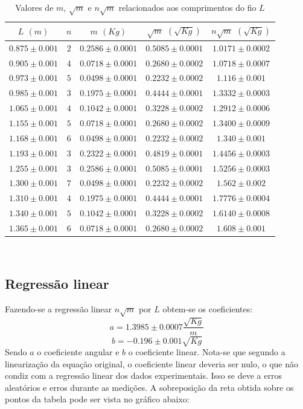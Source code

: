 \documentclass[12pt,a4paper]{article}
\begin{document}
\begin{table}[!htbp]
\centering
\def\arraystretch{1.3}
\caption{Valores de $m$, $\sqrt{m}$ e $n\sqrt{m}$ relacionados aos comprimentos do fio $L$}
\label{Resultados}
\begin{tabular}{|c|c|c|c|c|}
\hline
$L$ $(m)$ & $n$ & $m$ $(Kg)$ & $\sqrt{m}$ $(\sqrt{Kg})$ & $n\sqrt{m}$ $(\sqrt{Kg})$ \\
\hline
$0.875\pm0.001$ & $2$ & $0.2586\pm0.0001$ & $0.5085\pm0.0001$ & $1.0171\pm0.0002$ \\
\hline
$0.905\pm0.001$ & $4$ & $0.0718\pm0.0001$ & $0.2680\pm0.0002$ & $1.0718\pm0.0007$ \\
\hline
$0.973\pm0.001$ & $5$ & $0.0498\pm0.0001$ & $0.2232\pm0.0002$ & $1.116\pm0.001$ \\
\hline
$0.985\pm0.001$ & $3$ & $0.1975\pm0.0001$ & $0.4444\pm0.0001$ & $1.3332\pm0.0003$ \\
\hline
$1.065\pm0.001$ & $4$ & $0.1042\pm0.0001$ & $0.3228\pm0.0002$ & $1.2912\pm0.0006$ \\
\hline
$1.155\pm0.001$ & $5$ & $0.0718\pm0.0001$ & $0.2680\pm0.0002$ & $1.3400\pm0.0009$ \\
\hline
$1.168\pm0.001$ & $6$ & $0.0498\pm0.0001$ & $0.2232\pm0.0002$ & $1.340\pm0.001$ \\
\hline
$1.193\pm0.001$ & $3$ & $0.2322\pm0.0001$ & $0.4819\pm0.0001$ & $1.4456\pm0.0003$ \\
\hline
$1.255\pm0.001$ & $3$ & $0.2586\pm0.0001$ & $0.5085\pm0.0001$ & $1.5256\pm0.0003$ \\
\hline
$1.300\pm0.001$ & $7$ & $0.0498\pm0.0001$ & $0.2232\pm0.0002$ & $1.562\pm0.002$ \\
\hline
$1.310\pm0.001$ & $4$ & $0.1975\pm0.0001$ & $0.4444\pm0.0001$ & $1.7776\pm0.0004$ \\
\hline
$1.340\pm0.001$ & $5$ & $0.1042\pm0.0001$ & $0.3228\pm0.0002$ & $1.6140\pm0.0008$ \\
\hline
$1.365\pm0.001$ & $6$ & $0.0718\pm0.0001$ & $0.2680\pm0.0002$ & $1.608\pm0.001$ \\
\hline

\end{tabular} \\

\end{table}

\subsection{Regressão linear}
Fazendo-se a regressão linear $n\sqrt{m}$ por $L$ obtem-se os coeficientes:
$$a = 1.3985 \pm 0.0007 \dfrac{\sqrt{Kg}}{m}$$
$$b = -0.196 \pm 0.001 \sqrt{Kg}$$
Sendo $a$ o coeficiente angular e $b$ o coeficiente linear.
Nota-se que segundo a linearização da equação original, o coeficiente linear deveria ser nulo, o que não condiz com a regressão linear dos dados experimentais. Isso se deve a erros aleatórios e erros durante as medições.
A sobreposição da reta obtida sobre os pontos da tabela pode ser vista no gráfico abaixo:
\end{document}

